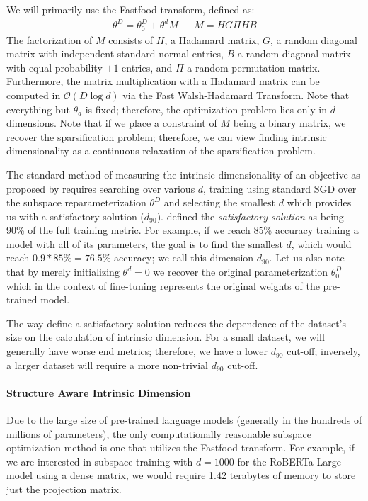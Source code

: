 \documentclass{article} %
\begin{document}
We will primarily use the Fastfood transform, defined as:
\begin{align}
    \theta^{D} = \theta^{D}_0 + \theta^{d}M && M=HG\Pi HB \label{eq:did}
\end{align}
The factorization of $M$ consists of $H$, a Hadamard matrix, $G$, a random diagonal matrix with independent standard normal entries, $B$ a random diagonal matrix with equal probability $\pm 1$ entries, and $\Pi$ a random permutation matrix. Furthermore, the matrix multiplication with a Hadamard matrix can be computed in $\mathcal{O}(D \log{d})$ via the Fast Walsh-Hadamard Transform. Note that everything but $\theta_d$ is fixed; therefore, the optimization problem lies only in $d$-dimensions. Note that if we place a constraint of $M$ being a binary matrix, we recover the sparsification problem; therefore, we can view finding intrinsic dimensionality as a continuous relaxation of the sparsification problem. 

The standard method of measuring the intrinsic dimensionality of an objective as proposed by \cite{intrinsic_dimension} requires searching over various $d$, training using standard SGD over the subspace reparameterization $\theta^{D}$ and selecting the smallest $d$ which provides us with a satisfactory solution ($d_{90}$). \cite{intrinsic_dimension} defined the \textit{satisfactory solution} as being 90\% of the full training metric. For example, if we reach 85\% accuracy training a model with all of its parameters, the goal is to find the smallest $d$, which would reach $0.9 * 85\% = 76.5\%$ accuracy; we call this dimension $d_{90}$. Let us also note that by merely initializing $\theta^d = 0$ we recover the original parameterization $\theta^{D}_0$ which in the context of fine-tuning represents the original weights of the pre-trained model.

The way \cite{intrinsic_dimension} define a satisfactory solution reduces the dependence of the dataset's size on the calculation of intrinsic dimension. For a small dataset, we will generally have worse end metrics; therefore, we have a lower $d_{90}$ cut-off; inversely, a larger dataset will require a more non-trivial $d_{90}$ cut-off.
\paragraph{Structure Aware Intrinsic Dimension}
Due to the large size of pre-trained language models (generally in the hundreds of millions of parameters), the only computationally reasonable subspace optimization method is one that utilizes the Fastfood transform. For example, if we are interested in subspace training with $d=1000$ for the RoBERTa-Large model using a dense matrix, we would require 1.42 terabytes of memory to store just the projection matrix.
\end{document}
